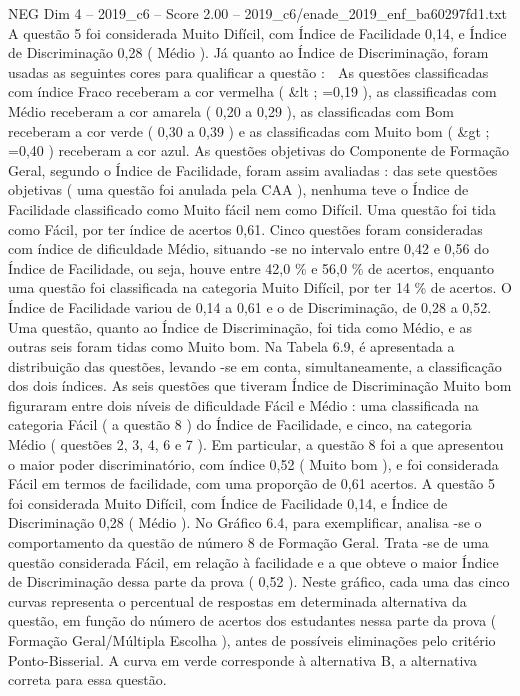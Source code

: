 \begin{textsample}{NEG Dim 4 – 2019\_c6 – Score 2.00 – 2019\_c6/enade\_2019\_enf\_ba60297fd1.txt}
A questão 5 foi considerada Muito Difícil, com Índice de Facilidade 0,14, e Índice de Discriminação 0,28 ( Médio ).
Já quanto ao Índice de Discriminação, foram usadas as seguintes cores para qualificar a questão :  As questões classificadas com índice Fraco receberam a cor vermelha ( \&lt ; =0,19 ), as classificadas com Médio receberam a cor amarela ( 0,20 a 0,29 ), as classificadas com Bom receberam a cor verde ( 0,30 a 0,39 ) e as classificadas com Muito bom ( \&gt ; =0,40 ) receberam a cor azul.
As questões objetivas do Componente de Formação Geral, segundo o Índice de Facilidade, foram assim avaliadas : das sete questões objetivas ( uma questão foi anulada pela CAA ), nenhuma teve o Índice de Facilidade classificado como Muito fácil nem como Difícil.
Uma questão foi tida como Fácil, por ter índice de acertos 0,61.
Cinco questões foram consideradas com índice de dificuldade Médio, situando -se no intervalo entre 0,42 e 0,56 do Índice de Facilidade, ou seja, houve entre 42,0 \% e 56,0 \% de acertos, enquanto uma questão foi classificada na categoria Muito Difícil, por ter 14 \% de acertos.
O Índice de Facilidade variou de 0,14 a 0,61 e o de Discriminação, de 0,28 a 0,52.
Uma questão, quanto ao Índice de Discriminação, foi tida como Médio, e as outras seis foram tidas como Muito bom.
Na Tabela 6.9, é apresentada a distribuição das questões, levando -se em conta, simultaneamente, a classificação dos dois índices.
As seis questões que tiveram Índice de Discriminação Muito bom figuraram entre dois níveis de dificuldade Fácil e Médio : uma classificada na categoria Fácil ( a questão 8 ) do Índice de Facilidade, e cinco, na categoria Médio ( questões 2, 3, 4, 6 e 7 ).
Em particular, a questão 8 foi a que apresentou o maior poder discriminatório, com índice 0,52 ( Muito bom ), e foi considerada Fácil em termos de facilidade, com uma proporção de 0,61 acertos.
A questão 5 foi considerada Muito Difícil, com Índice de Facilidade 0,14, e Índice de Discriminação 0,28 ( Médio ).
No Gráfico 6.4, para exemplificar, analisa -se o comportamento da questão de número 8 de Formação Geral.
Trata -se de uma questão considerada Fácil, em relação à facilidade e a que obteve o maior Índice de Discriminação dessa parte da prova ( 0,52 ).
Neste gráfico, cada uma das cinco curvas representa o percentual de respostas em determinada alternativa da questão, em função do número de acertos dos estudantes nessa parte da prova ( Formação Geral/Múltipla Escolha ), antes de possíveis eliminações pelo critério Ponto-Bisserial.
A curva em verde corresponde à alternativa B, a alternativa correta para essa questão.

\end{textsample}
